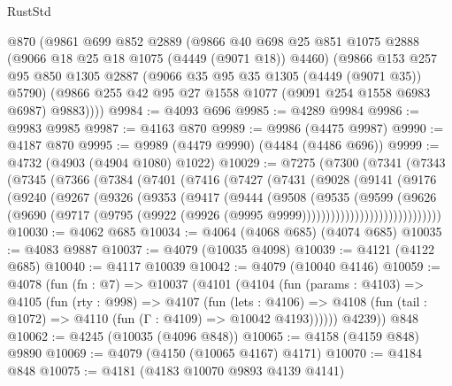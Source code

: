 \begin{lexlean}{RustStd}
\begin{coremodule}
{\begin{coremodule}
{{{{{{{{{{{{{{    @870
    (@9861
      @699
      @852
      @2889
      (@9866
        @40
        @698
        @25
        @851
        @1075
        @2888
        (@9066 @18 @25 @18 @1075 (@4449 (@9071 @18)) @4460)
        (@9866
          @153
          @257
          @95
          @850
          @1305
          @2887
          (@9066 @35 @95 @35 @1305 (@4449 (@9071 @35)) @5790)
          (@9866 @255 @42 @95 @27 @1558 @1077 (@9091 @254 @1558 @6983 @6987) @9883))))
@9984 := @4093 @696
@9985 := @4289 @9984
@9986 := @9983 @9985
@9987 := @4163 @870
@9989 := @9986 (@4475 @9987)
@9990 := @4187 @870
@9995 := @9989 (@4479 @9990) (@4484 (@4486 @696))
@9999 := @4732 (@4903 (@4904 @1080) @1022)
@10029 := @7275
    (@7300
      (@7341
        (@7343
          (@7345
            (@7366
              (@7384
                (@7401
                  (@7416
                    (@7427
                      (@7431
                        (@9028
                          (@9141
                            (@9176
                              (@9240
                                (@9267
                                  (@9326
                                    (@9353
                                      (@9417
                                        (@9444
                                          (@9508
                                            (@9535
                                              (@9599
                                                (@9626
                                                  (@9690
                                                    (@9717
                                                      (@9795
                                                        (@9922
                                                          (@9926
                                                            (@9995
                                                              @9999)))))))))))))))))))))))))))))
@10030 := @4062 @685
@10034 := @4064 (@4068 @685) (@4074 @685)
@10035 := @4083 @9887
@10037 := @4079 (@10035 @4098)
@10039 := @4121 (@4122 @685)
@10040 := @4117 @10039
@10042 := @4079 (@10040 @4146)
@10059 := @4078
    (fun (fn : @7) =>
    @10037
      (@4101
        (@4104
          (fun (params : @4103) =>
          @4105
            (fun (rty : @998) =>
            @4107
              (fun (lets : @4106) =>
              @4108 (fun (tail : @1072) => @4110 (fun (Γ : @4109) => @10042 @4193))))))
        @4239))
    @848
@10062 := @4245 (@10035 (@4096 @848))
@10065 := @4158 (@4159 @848) @9890
@10069 := @4079 (@4150 (@10065 @4167) @4171)
@10070 := @4184 @848
@10075 := @4181 (@4183 @10070 @9893 @4139 @4141)
}}}}}}}}}}}}}}
\end{coremodule}}
\end{coremodule}
\end{lexlean}

